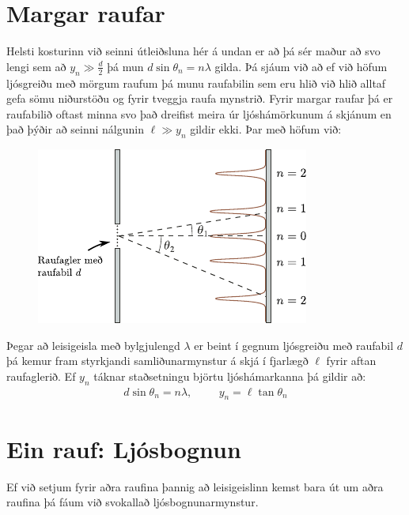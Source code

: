 \ifdefined \wholebook \else\documentclass[oneside]{book}\usepackage{EdlBook}\graphicspath{{figures/}}
\begin{document}
\section{Margar raufar}

Helsti kosturinn við seinni útleiðsluna hér á undan er að þá sér maður að svo lengi sem að $y_n \gg \frac{d}{2}$ þá mun $d\sin\theta_n = n\lambda$ gilda. Þá sjáum við að ef við höfum ljósgreiðu með mörgum raufum þá munu raufabilin sem eru hlið við hlið alltaf gefa sömu niðurstöðu og fyrir tveggja raufa mynstrið. Fyrir margar raufar þá er raufabilið oftast minna svo það dreifist meira úr ljóshámörkunum á skjánum en það þýðir að seinni nálgunin $\ell \gg y_n$ gildir ekki. Þar með höfum við:
\begin{figure}[H]
    \centering
    \includegraphics{figures/manyslits.pdf}
\end{figure}

\begin{tcolorbox}
\begin{theorem}
Þegar að leisigeisla með bylgjulengd $\lambda$ er beint í gegnum ljósgreiðu með raufabil $d$ þá kemur fram styrkjandi samliðunarmynstur á skjá í fjarlægð $\ell$ fyrir aftan raufaglerið. Ef $y_n$ táknar staðsetningu björtu ljóshámarkanna þá gildir að:
\begin{align*}
    d\sin\theta_n = n\lambda, \hspace{1cm} y_n = \ell \tan\theta_n
\end{align*}
\end{theorem}
\end{tcolorbox}

\section{Ein rauf: Ljósbognun}

Ef við setjum fyrir aðra raufina þannig að leisigeislinn kemst bara út um aðra raufina þá fáum við svokallað ljósbognunarmynstur.
\end{document}
